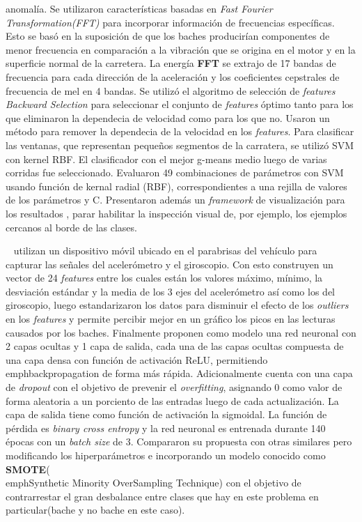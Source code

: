 anomalía. Se utilizaron características basadas en \emph{Fast Fourier Transformation(FFT)} para incorporar información de frecuencias específicas. Esto se basó en la
suposición de que los baches producirían componentes de menor frecuencia en comparación a la vibración que se origina en el motor y en la superficie normal de la carretera.
La energía \textbf{FFT} se extrajo de 17 bandas de frecuencia para cada dirección de la aceleración y los coeficientes cepstrales de frecuencia de mel en 4 bandas. Se
utilizó el algoritmo de selección de \emph{features} \emph{Backward Selection} para seleccionar el conjunto de \emph{features} óptimo tanto para los que eliminaron la
dependecia de velocidad como para los que no. Usaron un método para remover la dependecia de la velocidad en los \emph{features}.  Para clasificar las ventanas, que representan 
pequeños segmentos de la carratera, se utilizó SVM con kernel RBF. El clasificador con el mejor g-means medio luego de varias corridas fue seleccionado. Evaluaron 49 combinaciones 
de parámetros con SVM usando función de kernal radial (RBF), correspondientes a una rejilla de valores de los parámetros \gamma y C. Presentaron además un \emph{framework} de 
visualización para los resultados , parar habilitar la inspección visual de, por ejemplo, los ejemplos cercanos al borde de las clases.

~\cite{pawar2020efficient} utilizan un dispositivo móvil ubicado en el parabrisas del vehículo para capturar las señales del acelerómetro y el giroscopio. Con esto
construyen un vector de 24 \emph{features} entre los cuales están los valores máximo, mínimo, la desviación estándar y la media de los 3 ejes del acelerómetro así
como los del giroscopio, luego estandarizaron los datos para disminuir el efecto de los \emph{outliers} en los \emph{features} y permite percibir mejor en un gráfico
los picos en las lecturas causados por los baches. Finalmente proponen como modelo una red neuronal con 2 capas ocultas y 1 capa de salida, cada una de las capas ocultas
compuesta de una capa densa con función de activación ReLU, permitiendo \\emph{backpropagation} de forma más rápida. Adicionalmente cuenta con una capa de \emph{dropout}
con el objetivo de prevenir el \emph{overfitting}, asignando 0 como valor de forma aleatoria a un porciento de las entradas luego de cada actualización. La capa de salida 
tiene como función de activación la sigmoidal. La función de pérdida es \emph{binary cross entropy} y la red neuronal es entrenada durante 140 épocas con un \emph{batch size}
de 3. Compararon su propuesta con otras similares pero modificando los hiperparámetros e incorporando un modelo conocido como \textbf{SMOTE}(\\emph{Synthetic Minority
OverSampling Technique}) con el objetivo de contrarrestar el gran desbalance entre clases que hay en este problema en particular(bache y no bache en este caso). 

